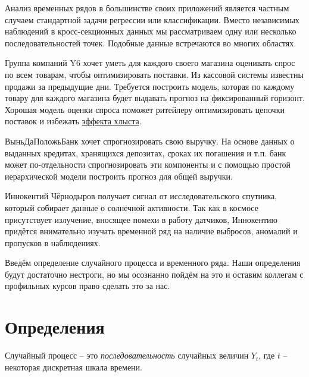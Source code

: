 \documentclass[12pt,fleqn]{article}
\begin{document}
	


Анализ временных рядов в большинстве своих приложений является частным случаем  стандартной задачи регрессии или классификации. Вместо независимых наблюдений в кросс-секционных данных мы рассматриваем одну или несколько последовательностей точек. Подобные данные встречаются во многих областях.
\begin{example}
	Группа компаний Y6 хочет уметь для каждого своего магазина оценивать спрос по всем товарам, чтобы оптимизировать поставки. Из кассовой системы известны продажи за предыдущие дни. Требуется построить модель, которая по каждому товару для каждого магазина будет выдавать прогноз на фиксированный горизонт. Хорошая модель оценки спроса поможет ритейлеру оптимизировать цепочки поставок и избежать \href{https://ardma.ru/marketing/osnovy-marketinga/effekt-khlysta/}{эффекта хлыста}.
\end{example}

\begin{example}
	ВыньДаПоложьБанк хочет спрогнозировать свою выручку. На основе данных о выданных кредитах, хранящихся депозитах, сроках их погашения и т.п. банк может по-отдельности спрогнозировать эти компоненты и с помощью простой иерархической модели построить прогноз для общей выручки.
\end{example}

\begin{example}
	Иннокентий Чёрнодыров получает сигнал от исследовательского спутника, который собирает данные о солнечной активности. Так как в космосе присутствует излучение, вносящее помехи в работу датчиков, Иннокентию придётся внимательно изучать временной ряд на наличие выбросов, аномалий и пропусков в наблюдениях.
\end{example}


Введём определение случайного процесса и временного ряда.  Наши определения будут достаточно нестроги, но мы осознанно пойдём на это и оставим коллегам с профильных курсов право сделать это за нас.

\section{Определения}

\begin{definition}
	Случайный процесс -- это \emph{последовательность} случайных величин $Y_t$, где $t$ -- некоторая дискретная шкала времени. 
\end{definition}
\end{document}

